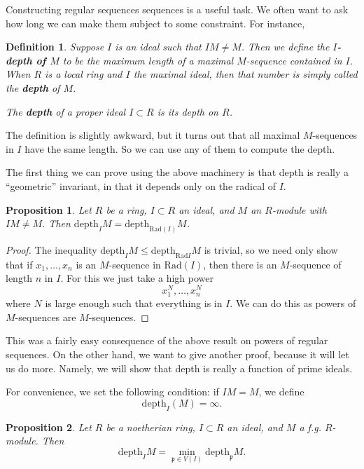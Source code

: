 \documentclass{article}
\newtheorem{definition}{Definition}
\newtheorem{proposition}{Proposition}
\begin{document}
Constructing regular sequences sequences is a useful task. We often want to ask
how long we can make them subject to some constraint. For instance, 

\begin{definition} 
Suppose $I$ is an ideal such that $IM \neq M$. Then we define the
\textbf{$I$-depth of $M$} to be the maximum length of a maximal $M$-sequence contained
in $I$. When $R$ is a local ring and $I$ the maximal ideal, then that number is
simply called the \textbf{depth} of $M$.

The \textbf{depth} of a proper ideal $I \subset R$ is its depth on $R$.
\end{definition} 


The definition is slightly awkward, but it turns out that all maximal
$M$-sequences in $I$ have the same length. So we can use any of them to compute
the depth. 

The first thing we can prove using the above machinery is that depth is really
a ``geometric'' invariant, in that it depends only on the radical of $I$.

\begin{proposition} 
Let $R$ be a ring, $I \subset R$ an ideal, and $M$ an $R$-module
with $IM \neq M$. Then $\mathrm{depth}_I M = \mathrm{depth}_{\mathrm{Rad}(I)} M$.
\end{proposition} 
\begin{proof} 
The inequality $\mathrm{depth}_I M \leq \mathrm{depth}_{\mathrm{Rad} I} M$ is trivial, so we need only
show that if $x_1, \dots, x_n$ is an $M$-sequence in $\mathrm{Rad}(I)$, then there is
an $M$-sequence of length $n$ in $I$. For this we just take a high power
\[ x_1^N, \dots, x_n^{N}  \]
where $N$ is large enough such that everything is in $I$. We can do this as
powers of $M$-sequences are $M$-sequences.
\end{proof} 

This was a fairly easy consequence of the above result on powers of regular
sequences. On the other hand, we want to give another proof, because it will
let us do more. Namely, we will show that depth is really a function of prime
ideals.

For convenience, we set the following condition: if $IM = M$, we define
\[ \mathrm{depth}_I (M) = \infty.  \]

\begin{proposition} 
Let $R$ be a noetherian ring, $I \subset R$ an ideal, and $M$ a f.g. $R$-module. 
Then
\[ \mathrm{depth}_I M = \min_{\mathfrak{p} \in V(I)} \mathrm{depth}_{\mathfrak{p}} M .  \]
\end{proposition} 
\end{document}
